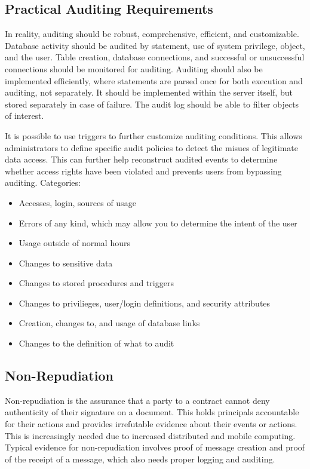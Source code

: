 \documentclass{math}
\begin{document}
\subsection*{Practical Auditing Requirements}
In reality, auditing should be robust, comprehensive, efficient, and
customizable. Database activity should be audited by statement, use of system
privilege, object, and the user. Table creation, database connections, and
successful or unsuccessful connections should be monitored for auditing.
Auditing should also be implemented efficiently, where statements are parsed
once for both execution and auditing, not separately. It should be implemented
within the server itself, but stored separately in case of failure. The audit
log should be able to filter objects of interest.
\par It is possible to use triggers to further customize auditing conditions.
This allows administrators to define specific audit policies to detect the
misues of legitimate data access. This can further help reconstruct audited
events to determine whether access rights have been violated and prevents users
from bypassing auditing. Categories:
\begin{itemize}
  \item Accesses, login, sources of usage
  \item Errors of any kind, which may allow you to determine the intent of the
  user
  \item Usage outside of normal hours
  \item Changes to sensitive data
  \item Changes to stored procedures and triggers
  \item Changes to privilieges, user/login definitions, and security attributes
  \item Creation, changes to, and usage of database links
  \item Changes to the definition of what to audit
\end{itemize}

\subsection*{Non-Repudiation}
Non-repudiation is the assurance that a party to a contract cannot deny
authenticity of their signature on a document. This holds principals
accountable for their actions and provides irrefutable evidence about their
events or actions. This is increasingly needed due to increased distributed
and mobile computing. Typical evidence for non-repudiation involves proof of
message creation and proof of the receipt of a message, which also needs proper
logging and auditing.
\end{document}

